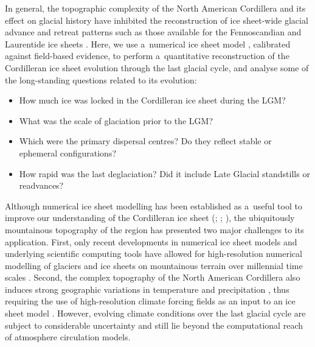 \documentclass[tc, manuscript]{copernicus}
\begin{document}
      In general, the topographic complexity of the North American
      Cordillera and its effect on glacial history have inhibited the
      reconstruction of ice sheet-wide glacial advance and retreat patterns
      such as those available for the Fennoscandian and Laurentide ice
      sheets \citep{Boulton.etal.2001, Dyke.Prest.1987, Dyke.etal.2003,
      Kleman.etal.1997, Kleman.etal.2010, Stroeven.etal.inreview}. Here, we
      use a~numerical ice sheet model \citep{PISM-authors.2015}, calibrated
      against field-based evidence, to perform a~quantitative reconstruction
      of the Cordilleran ice sheet evolution through the last glacial cycle,
      and analyse some of the long-standing questions related to its
      evolution:
\begin{itemize}
  \item How much ice was locked in the Cordilleran ice sheet during the LGM?
  \item What was the scale of glaciation prior to the LGM?
  \item Which were the primary dispersal centres? Do they reflect stable or
    ephemeral configurations?
  \item How rapid was the last deglaciation? Did it include Late Glacial
    standstills or readvances?
\end{itemize}
      Although numerical ice sheet modelling has been established as
      a~useful tool to improve our understanding of the Cordilleran ice
      sheet (\citealp[p.~227]{Jackson.Clague.1991}; \citealp{Robert.1991};
      \citealp{Marshall.etal.2000}), the ubiquitously mountainous topography
      of the region has presented two major challenges to its application.
      First, only recent developments in numerical ice sheet models and
      underlying scientific computing tools \citep{Bueler.Brown.2009,
      Balay.etal.2015} have allowed for high-resolution numerical modelling
      of glaciers and ice sheets on mountainous terrain over millennial time
      scales \citep[e.g.,][]{Golledge.etal.2012}. Second, the complex
      topography of the North American Cordillera also induces strong
      geographic variations in temperature and precipitation
      \citep{Jarosch.etal.2012}, thus requiring
      the use of high-resolution climate forcing fields as an input to an
      ice sheet model \citep{Seguinot.etal.2014}. However, evolving climate
      conditions over the last glacial cycle are subject to considerable
      uncertainty and still lie beyond the computational reach of atmosphere
      circulation models.
\end{document}
